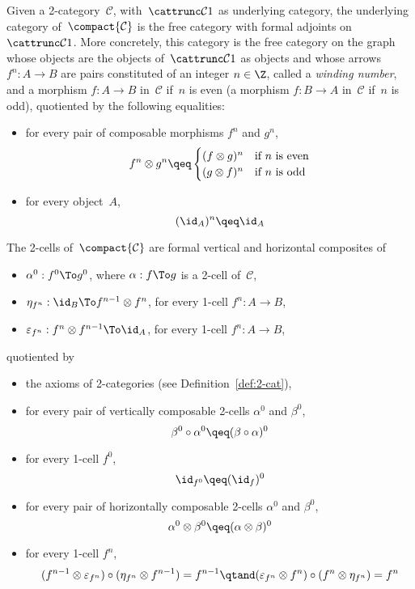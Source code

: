 \documentclass{LMCS}
\renewcommand{\C}{\mathcal{C}}
\begin{document}
Given a 2-category~$\C$, with~$\cattrunc\C1$ as underlying category, the
underlying category of~$\compact{\C}$ is the free category with formal adjoints
on~$\cattrunc\C1$. More concretely, this category is the free category on the
graph whose objects are the objects of~$\cattrunc\C1$ as objects and whose
arrows $f^n:A\to B$ are pairs constituted of an integer $n\in\Z$, called a
\emph{winding number}, and a morphism $f:A\to B$ in~$\C$ if~$n$ is even (\resp a
morphism $f:B\to A$ in~$\C$ if~$n$ is odd), quotiented by the following
equalities:
\begin{itemize}
\item for every pair of composable morphisms $f^n$ and $g^n$,
  \[
  f^n\otimes g^n \qeq
  \begin{cases}
    (f\otimes g)^n&\text{if $n$ is even}\\
    (g\otimes f)^n&\text{if $n$ is odd}
  \end{cases}
  \]
\item for every object~$A$,
  \[
  (\id_A)^n
  \qeq
  \id_A
  \]
\end{itemize}
The 2-cells of~$\compact{\C}$ are formal vertical and horizontal composites of
\begin{itemize}
\item $\alpha^0:f^0\To g^0$, where $\alpha:f\To g$ is a 2-cell of~$\C$,
\item $\eta_{f^n}:\id_B\To f^{n-1}\otimes f^n$, for every 1-cell $f^n:A\to B$,
\item $\varepsilon_{f^n}:f^n\otimes f^{n-1}\To\id_A$, for every 1-cell $f^n:A\to B$,
\end{itemize}
quotiented by
\begin{itemize}
\item the axioms of 2-categories (see Definition~\ref{def:2-cat}),
\item for every pair of vertically composable 2-cells $\alpha^0$ and $\beta^0$,
  \[
  \beta^0\circ\alpha^0
  \qeq
  (\beta\circ\alpha)^0
  \]
\item for every 1-cell $f^0$,
  \[
  \id_{f^0}
  \qeq
  (\id_f)^0
  \]
\item for every pair of horizontally composable 2-cells $\alpha^0$ and
  $\beta^0$,
  \[
  \alpha^0\otimes\beta^0
  \qeq
  (\alpha\otimes\beta)^0
  \]
\item for every 1-cell $f^n$,
  \[
  (f^{n-1}\otimes\varepsilon_{f^n})\circ(\eta_{f^n}\otimes f^{n-1})=f^{n-1}
  \qtand
  (\varepsilon_{f^n}\otimes f^n)\circ(f^n\otimes\eta_{f^n})=f^n
  \]
\end{itemize}
\end{document}
